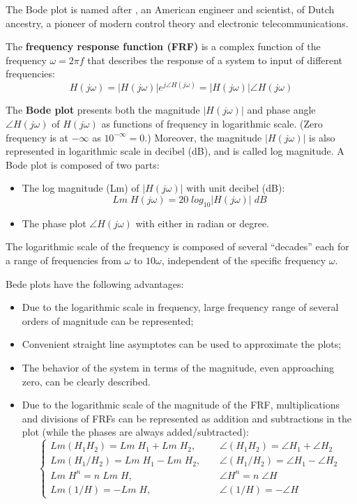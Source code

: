 The Bode plot is named after 
, an American engineer and scientist, of Dutch ancestry,
a pioneer of modern control theory and electronic telecommunications. 

The {\bf frequency response function (FRF)} is a complex function of the 
frequency $\omega=2\pi f$ that describes the response of a system to input of
different frequencies:
\[ H(j\omega)=|H(j\omega)|e^{j\angle H(j\omega)}=|H(j\omega)| \angle H(j\omega) \]

The {\bf Bode plot} presents both the magnitude $|H(j\omega)|$ and phase 
angle $\angle H(j\omega)$ of $H(j\omega)$ as functions of frequency in 
logarithmic scale. (Zero frequency is at $-\infty$ as $10^{-\infty}=0$.)
Moreover, the magnitude $| H(j\omega) |$ is also represented in logarithmic
scale in decibel (dB), and is called log magnitude.
A Bode plot is composed of two parts:
\begin{itemize}
  \item The log magnitude (Lm) of $|H(j\omega)|$ with unit decibel (dB):
  \[ Lm\; H(j\omega)=20 \;log_{10} |H(j\omega)|\;dB \]
  \item The phase plot $\angle H(j\omega)$ with either in radian or degree.
\end{itemize}
The logarithmic scale of the frequency is composed of several ``decades'' each 
for a range of frequencies from $\omega$ to $10 \omega$, independent of the 
specific frequency $\omega$.

Bede plots have the following advantages:
\begin{itemize}
  \item Due to the logarithmic scale in frequency, large frequency range of 
    several orders of magnitude can be represented;

  \item Convenient straight line asymptotes can be used to approximate the plots;

  \item The behavior of the system in terms of the magnitude, even
    approaching zero, can be clearly described.
    
  \item Due to the logarithmic scale of the magnitude of the FRF, multiplications 
    and divisions of FRFs can be represented as addition and subtractions in the 
    plot (while the phases are always added/subtracted):
    \[ \left\{ \begin{array}{ll}
      Lm(H_1H_2)=Lm\;H_1+Lm\;H_2,&\;\;\;\;\angle (H_1H_2)=\angle H_1+\angle H_2\\
      Lm(H_1/H_2)=Lm\;H_1-Lm\;H_2,&\;\;\;\;\angle (H_1/H_2)=\angle H_1-\angle H_2\\
      Lm \;H^n=n\;Lm \;H,&\;\;\;\;\angle H^n=n\;\angle H \\
      Lm (1/H)=-Lm\;H,&\;\;\;\;\angle (1/H)=-\angle H \end{array} \right. \]
\end{itemize}

